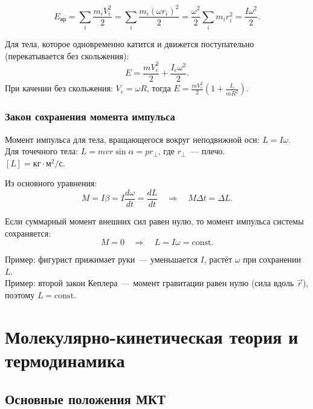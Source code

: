 \documentclass[12pt]{article}
\begin{document}
\[
	E_{\text{вр}} = \sum_i \frac{m_i V_i^2}{2} = \sum_i \frac{m_i (\omega r_i)^2}{2} = \frac{\omega^2}{2} \sum_i m_i r_i^2 = \frac{I\omega^2}{2}.
\]

Для тела, которое одновременно катится и движется поступательно (перекатывается без скольжения):
\[
	E = \frac{mV_c^2}{2} + \frac{I_c \omega^2}{2}.
\]
При качении без скольжения: $V_c = \omega R$, тогда $E = \frac{mV_c^2}{2}\left(1 + \frac{I_c}{mR^2}\right)$.

\subsubsection{Закон сохранения момента импульса}

\begin{definition}
	Момент импульса для тела, вращающегося вокруг неподвижной оси: $L = I\omega$.\\
	Для точечного тела: $L = mvr\sin\alpha = pr_\perp$, где $r_\perp$~--- плечо.\\
	$[L] = \text{кг}\cdot\text{м}^2/\text{с}$.
\end{definition}

Из основного уравнения:
\[
	M = I\beta = I\frac{d\omega}{dt} = \frac{dL}{dt} \quad \Longrightarrow \quad M\Delta t = \Delta L.
\]

\begin{law}
	Если суммарный момент внешних сил равен нулю, то момент импульса системы сохраняется:
	\[
		M = 0 \quad \Longrightarrow \quad L = I\omega = \mathrm{const}.
	\]
\end{law}

Пример: фигурист прижимает руки~--- уменьшается $I$, растёт $\omega$ при сохранении $L$.\\
Пример: второй закон Кеплера~--- момент гравитации равен нулю (сила вдоль $\vec{r}$), поэтому $L = \mathrm{const}$.

\newpage
\section{Молекулярно-кинетическая теория и термодинамика}

\subsection{Основные положения МКТ}
\end{document}
